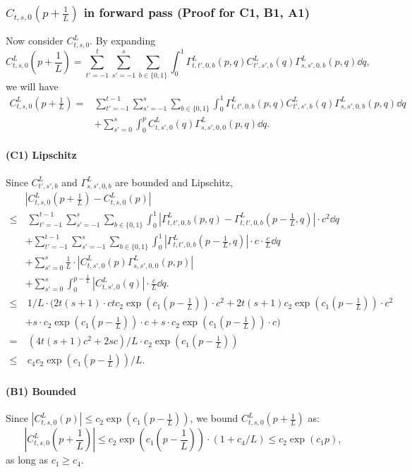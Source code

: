 \documentclass{article}
\theoremstyle{plain}
\theoremstyle{definition}
\begin{document}
\subsubsection{$C_{t,s,0}(p+\frac1L)$ in forward pass (Proof for C1, B1, A1)}

Now consider $C^L_{t,s,0}$. By expanding 
\[C^L_{t,s,0}(p+\frac1L)=\sum_{t'=-1}^{t}\sum_{s'=-1}^{s}\sum_{b\in\{0,1\}}\int_0^1 \Gamma^L_{t,t',0,b}(p,q) C^L_{t',s',b}(q)\Gamma^L_{s,s',0,b}(p,q) \dd q,\]
we will have 
\begin{align*}
    C^L_{t,s,0}(p+\frac1L)=& \sum_{t'=-1}^{t-1}\sum_{s'=-1}^{s}\sum_{b\in\{0,1\}}\int_0^1 \Gamma^L_{t,t',0,b}(p,q) C^L_{t',s',b}(q)\Gamma^L_{s,s',0,b}(p,q) \dd q \\
    & + \sum_{s'=0}^{s}\int_0^{p} C^L_{t,s',0}(q)\Gamma^L_{s,s',0,0}(p,q) \dd q.
\end{align*}
\paragraph{(C1) Lipschitz} Since $C^L_{t',s',b}$ and $\Gamma^L_{s,s',0,b}$ are bounded and Lipschitz,
\begin{align*}
    & |C^L_{t,s,0}(p+\frac1L) - C^L_{t,s,0}(p)|\\
    \leq &~ \sum_{t'=-1}^{t-1}\sum_{s'=-1}^{s}\sum_{b\in\{0,1\}}\int_0^1 |\Gamma^L_{t,t',0,b}(p,q) - \Gamma^L_{t,t',0,b}(p-\frac1L,q)| \cdot c^2 \dd q \\
    & + \sum_{t'=-1}^{t-1}\sum_{s'=-1}^{s}\sum_{b\in\{0,1\}}\int_0^1 |\Gamma^L_{t,t',0,b}(p-\frac1L,q)| \cdot c\cdot \frac cL \dd q \\
    & + \sum_{s'=0}^{s} \frac1L \cdot |C^L_{t,s',0}(p)\Gamma^L_{s,s',0,0}(p,p)| \\
    & + \sum_{s'=0}^{s}\int_0^{p-\frac1L} |C^L_{t,s',0}(q)|\cdot \frac cL \dd q.\\
    \leq &~ 1/L \cdot (2t(s+1)  \cdot ctc_2\exp(c_1 (p-\frac1L))\cdot c^2 + 2t(s+1) c_2\exp(c_1 (p-\frac1L)) \cdot c^2\\
    & +   s \cdot  c_2\exp(c_1 (p-\frac1L))\cdot c + s \cdot c_2\exp(c_1 (p-\frac1L)) \cdot c) \\
    = &~ (4t(s+1)c^2+2sc)/L\cdot  c_2\exp(c_1 (p-\frac1L))\\
    \leq &~ c_4 c_2\exp(c_1 (p-\frac1L)) / L.
\end{align*}
\paragraph{(B1) Bounded} Since $|C^L_{t,s,0}(p)|\leq c_2\exp(c_1 (p-\frac1L))$, we bound $C^L_{t,s,0}(p+\frac1L)$ as:
\[|C^L_{t,s,0}(p+\frac1L)|\leq c_2\exp(c_1 (p-\frac1L)) \cdot (1 + c_4/L)\leq c_2\exp(c_1 p),\]
as long as $c_1 \geq c_4$.
\end{document}
